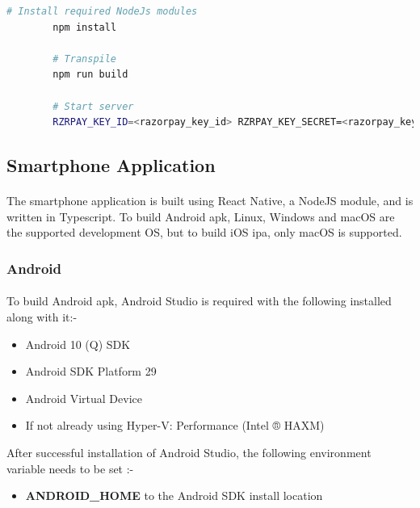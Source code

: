 \documentclass[12pt]{article}
\begin{document}
        \begin{lstlisting}[language=bash, caption=\acrshort{lrrs} Server]
        # Install required NodeJs modules
        npm install
    
        # Transpile
        npm run build
    
        # Start server
        RZRPAY_KEY_ID=<razorpay_key_id> RZRPAY_KEY_SECRET=<razorpay_key_secret> node dist/main.js
        \end{lstlisting}
    
    \subsection{Smartphone Application}
        \paragraph{}
        The smartphone application is built using React Native, a NodeJS module, and is written in Typescript. To build Android \acrshort{apk}, Linux, Windows and macOS are the supported development OS, but to build iOS \acrshort{ipa}, only macOS is supported.
        \subsubsection{Android}
            \paragraph{}
            To build Android \acrshort{apk}, Android Studio is required with the following installed along with it:- 
            \begin{itemize}
                \item Android 10 (Q) SDK
                \item Android SDK Platform 29
                \item Android Virtual Device
                \item If not already using Hyper-V: Performance (Intel ® HAXM)
            \end{itemize}
            After successful installation of Android Studio, the following environment variable needs to be set :-
            \begin{itemize}
                \item \textbf{ANDROID\_HOME} to the Android SDK install location
            \end{itemize}
        
\end{document}
